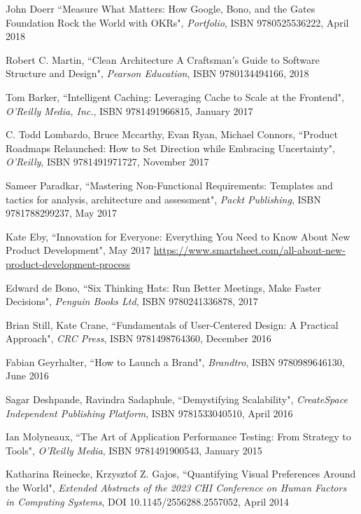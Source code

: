 \begin{thebibliography}{100}
 John Doerr  ``Measure What Matters: How Google, Bono, and the Gates Foundation Rock the World
with OKRs", \emph{Portfolio}, ISBN 9780525536222, April 2018

 Robert C. Martin, ``Clean Architecture A Craftsman's Guide to Software Structure and 
Design", \emph{Pearson Education}, ISBN 9780134494166, 2018

 Tom Barker, ``Intelligent Caching: Leveraging Cache to Scale at the Frontend", 
\emph{O'Reilly Media, Inc.}, ISBN 9781491966815, January 2017

 C. Todd Lombardo, Bruce Mccarthy, Evan Ryan, Michael Connors, ``Product Roadmaps Relaunched: How 
to Set Direction while Embracing Uncertainty", \emph{O'Reilly}, ISBN 9781491971727, November 2017

 Sameer Paradkar, ``Mastering Non-Functional Requirements: Templates and tactics for analysis, 
architecture and assessment", \emph{Packt Publishing}, ISBN 9781788299237, May 2017

 Kate Eby, ``Innovation for Everyone: Everything You Need to Know About New Product 
Development", May 2017
\href{https://www.smartsheet.com/all-about-new-product-development-process}{https://www.smartsheet.com/all-about-new-product-development-process}

 Edward de Bono, ``Six Thinking Hats: Run Better Meetings, Make Faster Decisions",
\emph{Penguin Books Ltd}, ISBN 9780241336878, 2017

 Brian Still, Kate Crane, ``Fundamentals of User-Centered Design: A Practical Approach", 
\emph{CRC Press}, ISBN 9781498764360, December 2016

 Fabian Geyrhalter, ``How to Launch a Brand", \emph{Brandtro}, ISBN 9780989646130, June 2016

 Sagar Deshpande, Ravindra Sadaphule, ``Demystifying Scalability", \emph{CreateSpace Independent 
Publishing Platform}, ISBN 9781533040510, April 2016

 Ian Molyneaux, ``The Art of Application Performance Testing: From Strategy to Tools", 
\emph{O'Reilly Media}, ISBN 9781491900543, January 2015

 Katharina Reinecke, Krzysztof Z. Gajos, ``Quantifying Visual Preferences Around the World", 
\emph{Extended Abstracts of the 2023 CHI Conference on Human Factors in Computing Systems}, DOI 10.1145/2556288.2557052, 
April 2014


\end{thebibliography}
